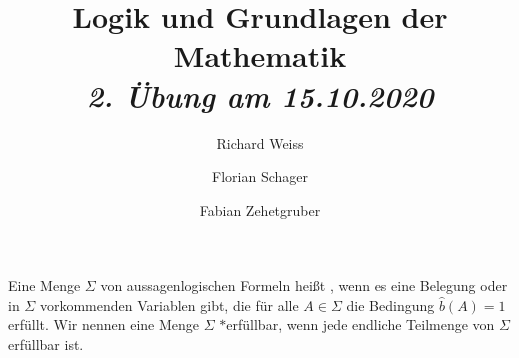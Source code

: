\documentclass{article}
\title
{
  Logik und Grundlagen der Mathematik \\
  \vspace{4pt}
  \normalsize
  \textit{2. Übung am 15.10.2020}
}
\author
{
  Richard Weiss
  \and
  Florian Schager
  \and
  Fabian Zehetgruber
}
\date{}
\begin{document}
\maketitle

Eine Menge $\Sigma$ von aussagenlogischen Formeln heißt , wenn es eine Belegung oder in $\Sigma$ vorkommenden Variablen gibt, die für alle $A \in \Sigma$ die Bedingung $\hat{b}(A) = 1$ erfüllt.
Wir nennen eine Menge $\Sigma$ $\ast$erfüllbar, wenn jede endliche Teilmenge von $\Sigma$ erfüllbar ist.



% 




% 

% 
% 
% 
% 
\end{document}
